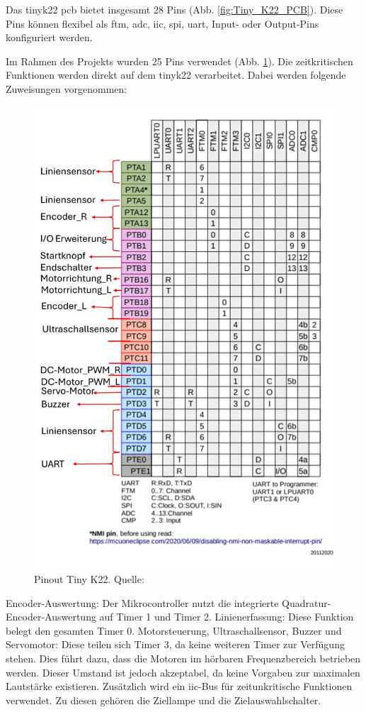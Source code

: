 Das \gls{tinyk22} \acrshort{pcb} bietet insgesamt 28 Pins (Abb. \ref{fig:Tiny_K22_PCB}). Diese Pins können flexibel als \acrfull{ftm}, \acrfull{adc}, \acrfull{iic}, \acrfull{spi}, \acrshort{uart}, Input- oder Output-Pins konfiguriert werden.

Im Rahmen des Projekts wurden 25 Pins verwendet (Abb. \ref{fig:Tiny_K22_Pinout_definition}). Die zeitkritischen Funktionen werden direkt auf dem \gls{tinyk22} verarbeitet. Dabei werden folgende Zuweisungen vorgenommen:

\begin{figure}[H]
    \centering
    \includegraphics[width=0.8\linewidth, angle=-90]{img/Tiny_K22_Pinout_definition.jpg}
    \caption{Pinout Tiny K22. Quelle: \cite{tiny-K22-Pinout}}
    \label{fig:Tiny_K22_Pinout_definition}
\end{figure}

Encoder-Auswertung: Der Mikrocontroller nutzt die integrierte Quadratur-Encoder-Auswertung auf Timer 1 und Timer 2.
 \newline Linienerfassung: Diese Funktion belegt den gesamten Timer 0.
 \newline Motorsteuerung, Ultraschallsensor, Buzzer und Servomotor: Diese teilen sich Timer 3, da keine weiteren Timer zur Verfügung stehen. Dies führt dazu, dass die Motoren im hörbaren Frequenzbereich betrieben werden. Dieser Umstand ist jedoch akzeptabel, da keine Vorgaben zur maximalen Lautstärke existieren.
Zusätzlich wird ein \acrshort{iic}-Bus für zeitunkritische Funktionen verwendet. Zu diesen gehören die Ziellampe und die Zielauswahlschalter.

